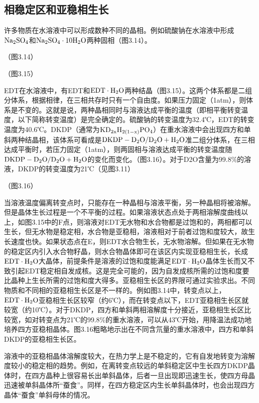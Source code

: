 \subsection{相稳定区和亚稳相生长}
许多物质在水溶液中可以形成数种不同的晶相。例如硫酸钠在水溶液中形成$\rm Na_2SO_4$和$\rm Na_2SO_4\cdot 10H_2O$两种固相（图3.14）。

（图3.14）

（图3.15）

EDT在水溶液中，有EDT和$\rm EDT\cdot H_2O$两种结晶（图3.15）。这两个体系都是二组分体系，根据相律，在三相共存时只有一个自由度。如果压力固定（1atm），则体系是不变的。这就是说，两种晶相同时与溶液达成平衡的温度（即相平衡转变温度，以下简称转变温度）是完全确定的。硫酸钠的转变温度为32.4℃，EDT的转变温度为40.6℃。DKDP（通常为$\rm KD_{2x}H_{2(1-x)}PO_4$）在重水溶液中会出现四方和单斜两种结晶相，该体系可看成是$\rm DKDP-D_2O/D_2O+H_2O$准二组分体系，在三相达成平衡时，若压力固定（1atm），则两固相与溶液达成平衡的转变温度随$\rm DKDP-D_2O/D_2O+H_2O$的变化而变化。（图3.16）。对于D2O含量为99.8\%的溶液，DKDP的转变温度为21℃（见图3.11）

（图3.16）

当溶液温度偏离转变点时，只能存在一种晶相与溶液平衡，另一种晶相将被溶解。但是晶体生长过程是一个不平衡的过程。如果溶液状态点处于两相溶解度曲线以上，如图3.15中的F点，则溶液对EDT无水物和水合物都是过饱和的，两相都可以生长，但无水物是稳定相，水合物是亚稳相，溶液相对于前者过饱和度较大，故生长速度也快。如果状态点在E，则EDT水合物生长，无水物溶解。但如果在无水物的稳定区内引入水合物籽晶，则水合物晶体即可在该区内实现亚稳相生长，长成$\rm EDT\cdot H_2O$大晶体，前提条件是溶液的过饱和度能满足$\rm EDT\cdot H_2O$晶体生长而又不致引起EDT稳定相自发成核。这是完全可能的，因为自发成核所需的过饱和度要比晶种上生长所需的过饱和度大得多。亚稳相生长区的界限可通过实验求出。不同物质和不同相的亚稳相生长区是不一样的。例如图3.14中，转变点以上，$\rm EDT\cdot H_2O$亚稳相生长区较窄（约6℃），而在转变点以下，EDT亚稳相生长区就较宽（约10℃）。对于DKDP，四方和单斜两相溶解度十分接近，亚稳相生长区比较宽，如对转变点为21℃的99.8\%的重水溶液，可以从43℃开始，用降温法成功地培养四方亚稳相晶体。图3.16粗略地示出在不同含氘量的重水溶液中，四方和单斜DKDP的亚稳相生长区。

溶液中的亚稳相晶体溶解度较大，在热力学上是不稳定的，它有自发地转变为溶解度较小的稳定相的趋势。例如，在离转变点较远的单斜稳定区中生长四方DKDP晶体时，在四方晶种上很容易长出单斜晶体，后者一旦出现即迅速生长，使四方母晶迅速被单斜晶体所“蚕食”。同样，在四方稳定区内生长单斜晶体时，也会出现四方晶体“蚕食”单斜母体的情况。

